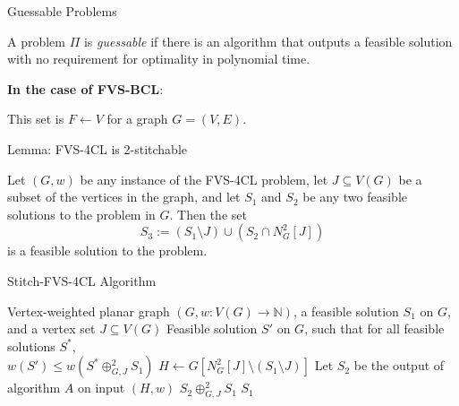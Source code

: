 \documentclass{beamer}
\begin{document}
\begin{frame}{Guessable Problems}
    \begin{definition}[Guessable]
        A problem $\Pi$ is \emph{guessable} if there is an algorithm that outputs a 
        feasible solution 
        with no requirement for optimality in polynomial time.
    \end{definition}

    \textbf{In the case of FVS-BCL}:

    This set is $F \leftarrow V$ for a graph $G = (V, E)$.
\end{frame}

\begin{frame}{Lemma: FVS-4CL is 2-stitchable}
  \begin{lemma}
    Let $(G, w)$ be any instance of the FVS-4CL problem, let $J \subseteq V(G)$ be a subset
    of the vertices in the graph, and let $S_1$ and $S_2$ be any two feasible solutions 
    to the problem in $G$. Then the set
    \[
    S_3 := (S_1 \setminus J) \cup (S_2 \cap N^{2}_{G}[J])
    \]
    is a feasible solution to the problem.
  \end{lemma}
\end{frame}

\begin{frame}[fragile]{Stitch-FVS-4CL Algorithm}
  \begin{algorithm}[H]
  \caption{Stitch-FVS-4CL}
    \begin{algorithmic}[1]
      \REQUIRE Vertex-weighted planar graph $(G, w:V(G) \to \mathbb{N})$, a feasible solution $S_1$ on $G$, and a vertex set $J \subseteq V(G)$
      \ENSURE Feasible solution $S'$ on $G$, such that for all feasible solutions $S^*$,\\
      \hspace{0.5em} $w(S') \leq w(S^* \oplus^{2}_{G,J} S_1)$
      \STATE $H \leftarrow G[N^{2}_{G}[J] \setminus (S_1 \setminus J)]$
      \STATE Let $S_2$ be the output of algorithm $A$ on input $(H, w)$
          \RETURN $S_2 \oplus^{2}_{G,J} S_1$
      \ELSE
          \RETURN $S_1$
      \ENDIF
    \end{algorithmic}
  \end{algorithm}
\end{frame}
\end{document}
